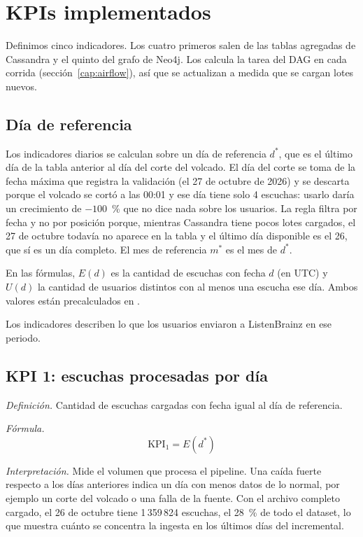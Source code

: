 \section{KPIs implementados}
\label{cap:kpis}

Definimos cinco indicadores. Los cuatro primeros salen de las tablas agregadas de Cassandra y el quinto del grafo de Neo4j. Los calcula la tarea  del DAG en cada corrida (sección~\ref{cap:airflow}), así que se actualizan a medida que se cargan lotes nuevos.

\subsection{Día de referencia}

Los indicadores diarios se calculan sobre un día de referencia $d^{*}$, que es el último día de la tabla  anterior al día del corte del volcado. El día del corte se toma de la fecha máxima que registra la validación (el 27 de octubre de 2026) y se descarta porque el volcado se cortó a las 00:01 y ese día tiene solo 4 escuchas: usarlo daría un crecimiento de $-100$~\% que no dice nada sobre los usuarios. La regla filtra por fecha y no por posición porque, mientras Cassandra tiene pocos lotes cargados, el 27 de octubre todavía no aparece en la tabla y el último día disponible es el 26, que sí es un día completo. El mes de referencia $m^{*}$ es el mes de $d^{*}$.

En las fórmulas, $E(d)$ es la cantidad de escuchas con fecha $d$ (en UTC) y $U(d)$ la cantidad de usuarios distintos con al menos una escucha ese día. Ambos valores están precalculados en .

Los indicadores describen lo que los usuarios enviaron a ListenBrainz en ese periodo.

\subsection{KPI 1: escuchas procesadas por día}

\textit{Definición.} Cantidad de escuchas cargadas con fecha igual al día de referencia.

\textit{Fórmula.}
\[
\text{KPI}_1 = E(d^{*})
\]

\textit{Interpretación.} Mide el volumen que procesa el pipeline. Una caída fuerte respecto a los días anteriores indica un día con menos datos de lo normal, por ejemplo un corte del volcado o una falla de la fuente. Con el archivo completo cargado, el 26 de octubre tiene 1\,359\,824 escuchas, el 28~\% de todo el dataset, lo que muestra cuánto se concentra la ingesta en los últimos días del incremental.

